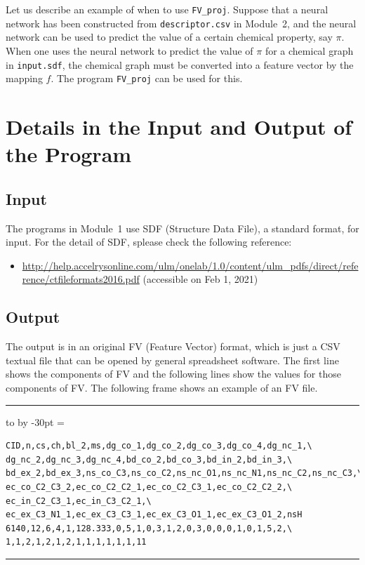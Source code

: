 \documentclass[11pt,titlepage,dvipdfmx,twoside]{book}
\newenvironment{myframe}{\begin{trivlist}\item[]
    \hrule
    \hbox to \linewidth\bgroup
    \advance\linewidth by -30pt
    \hsize=\linewidth
    \vrule\hfill
    \vbox\bgroup
    \vskip15pt
    \def\thempfootnote{\arabic{mpfootnote}}
    \begin{minipage}{\linewidth}}{%
    \end{minipage}\vskip15pt
    \egroup\hfill\vrule
    \egroup\hrule
\end{trivlist}}
\begin{document}
Let us describe an example of when to use {\tt FV\_proj}.
Suppose that a neural network has been constructed from
{\tt descriptor.csv} in Module~2,
and the neural network can be used to predict
the value of a certain chemical property, say $\pi$.
When one uses the neural network to predict
the value of $\pi$ for a chemical graph in {\tt input.sdf},
the chemical graph must be converted into
a feature vector by the mapping $f$.
The program {\tt FV\_proj} can be used for this. 


\section{Details in the Input and Output of the Program}
\label{chap:io}


\subsection{Input}

The programs in Module~1
use SDF (Structure Data File),
a standard format, for input.
For the detail of SDF, splease check the following reference: 
\begin{itemize}
\item \url{http://help.accelrysonline.com/ulm/onelab/1.0/content/ulm_pdfs/direct/reference/ctfileformats2016.pdf} (accessible on Feb 1, 2021)
\end{itemize}



\subsection{Output}
The output is in an original FV (Feature Vector) format, which is just a CSV textual file that can
be opened by general spreadsheet software.
The first line shows the components of FV and the following lines show the values
for those components of FV.
The following frame shows an example of an FV file. 

\begin{myframe}
\begin{verbatim}
CID,n,cs,ch,bl_2,ms,dg_co_1,dg_co_2,dg_co_3,dg_co_4,dg_nc_1,\
dg_nc_2,dg_nc_3,dg_nc_4,bd_co_2,bd_co_3,bd_in_2,bd_in_3,\
bd_ex_2,bd_ex_3,ns_co_C3,ns_co_C2,ns_nc_O1,ns_nc_N1,ns_nc_C2,ns_nc_C3,\
ec_co_C2_C3_2,ec_co_C2_C2_1,ec_co_C2_C3_1,ec_co_C2_C2_2,\
ec_in_C2_C3_1,ec_in_C3_C2_1,\
ec_ex_C3_N1_1,ec_ex_C3_C3_1,ec_ex_C3_O1_1,ec_ex_C3_O1_2,nsH
6140,12,6,4,1,128.333,0,5,1,0,3,1,2,0,3,0,0,0,1,0,1,5,2,\
1,1,2,1,2,1,2,1,1,1,1,1,1,11
\end{verbatim}
\end{myframe}
\end{document}

